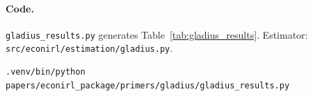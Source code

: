 \documentclass[10pt]{article}
\begin{document}
\paragraph{Code.}
\texttt{gladius\_results.py} generates Table~\ref{tab:gladius_results}. Estimator: \texttt{src/econirl/estimation/gladius.py}.
\begin{verbatim}
.venv/bin/python papers/econirl_package/primers/gladius/gladius_results.py
\end{verbatim}




\end{document}
